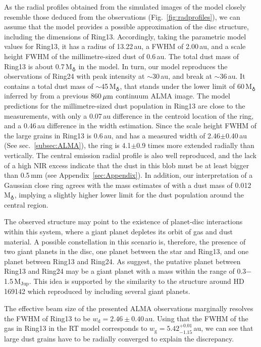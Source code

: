 \documentclass[fleqn,usenatbib,useAMS]{mnras}
\begin{document}
As the radial profiles obtained from the simulated images of the model closely resemble those deduced from the observations (Fig.~\ref{fig:radprofiles}), we can assume that the model provides a possible approximation of the disc structure, including the dimensions of Ring13. Accordingly, taking the parametric model values for Ring13, it has a radius of 13.22\,au, a FWHM of 2.00\,au, and a scale height FWHM of the millimetre-sized dust of 0.6\,au. The total dust mass of Ring13 is about 0.7\,M$_{\earth}$ in the model. In turn, our model reproduces the observations of Ring24 with peak intensity at $\sim$30\,au, and break at $\sim$36\,au. It contains a total dust mass of $\sim$45\,M$_{\earth}$, that stands under the lower limit of 60\,M$_{\earth}$ inferred by \citet{Ru_z_Rodr_guez_2019} from a previous 860\,$\hbox{$\mu$m}$ continuum ALMA image. The model predictions for the millimetre-sized dust population in Ring13 are close to the measurements, with only a 0.07\,au difference in the centroid location of the ring, and a 0.46\,au difference in the width estimation. Since the scale height FWHM of the large grains in Ring13 is 0.6\,au, and has a measured width of 2.46$\pm$0.40\,au (See sec.~\ref{subsec:ALMA}), the ring is 4.1$\pm$0.9 times more extended radially than vertically. The central emission radial profile is also well reproduced, and the lack of a high NIR excess indicate that the dust in this blob must be at least bigger than 0.5\,mm (see Appendix~\ref{sec:Appendix}). In addition, our interpretation of a Gaussian close ring agrees with the mass estimates of \citet{Francis_2020} with a dust mass of 0.012\,M$_{\earth}$, implying a slightly higher lower limit for the dust population around the central region. 

The observed structure may point to the existence of planet-disc interactions within this system, where a giant planet depletes its orbit of gas and dust material. A possible constellation in this scenario is, therefore, the presence of two giant planets in the disc, one planet between the star and Ring13, and one planet between Ring13 and Ring24. As \citet{Ru_z_Rodr_guez_2019} suggest, the putative planet between Ring13 and Ring24 may be a giant planet with a mass within the range of 0.3$-$1.5\,$\mathrm{M}_{\mathrm{Jup}}$. This idea is supported by the similarity to the structure around HD\,169142 which \citet{2020arXiv200711565B} reproduced by including several giant planets.

The effective beam size of the presented ALMA observations marginally resolves the FWHM of Ring13 to be $w_\mathrm{d} = 2.46\pm0.40$\,au. Using that the FWHM of the gas in Ring13 in the RT model corresponds to $w_\mathrm{g} = 5.42^{+0.01}_{-1.15}$\,au, we can see that large dust grains have to be radially converged to explain the discrepancy.
\end{document}
